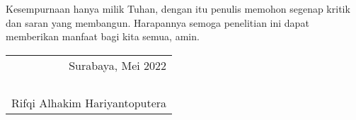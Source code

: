 Kesempurnaan hanya milik Tuhan, dengan itu penulis memohon segenap kritik dan saran yang membangun. Harapannya semoga penelitian ini dapat memberikan manfaat bagi kita semua, amin.

\begin{flushright}
  \begin{tabular}[b]{r}
    Surabaya, Mei 2022\\
    \\
    \\
    \\
    \\
    Rifqi Alhakim Hariyantoputera
  \end{tabular}
\end{flushright}
